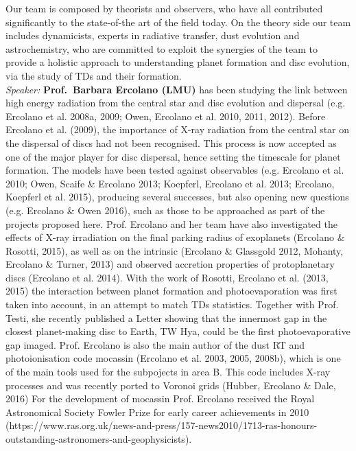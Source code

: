 \documentclass[10pt,fleqn,twoside]{article}
\begin{document}
Our team is composed by theorists and observers, who have all
contributed significantly to the state-of-the art of the field today. 
On the theory side our team includes
dynamicists, experts in radiative transfer, dust evolution and astrochemistry, who are
committed to exploit the synergies of the team to provide a holistic
approach to understanding planet formation and disc evolution, via the
study of TDs and their formation. \\

{\it Speaker: }{\bf Prof.\ Barbara Ercolano (LMU)} has been studying the link between high
energy radiation from the central star and disc evolution and
dispersal (e.g. Ercolano et al. 2008a, 2009; Owen, Ercolano et
al. 2010, 2011, 2012). Before Ercolano et al. (2009), the importance
of X-ray radiation from the central star on the dispersal of discs had
not been recognised. This process is now accepted as one of the major
player for disc dispersal, hence setting the timescale for planet
formation. The models have been tested against observables
(e.g. Ercolano et al. 2010; Owen, Scaife \& Ercolano 2013; Koepferl,
Ercolano et al. 2013; Ercolano, Koepferl et al. 2015), producing
several successes, but also opening new questions (e.g. Ercolano \&
Owen 2016), such as those to be
approached as part of the projects proposed here. Prof. Ercolano and
her team have also investigated the effects of X-ray irradiation on
the final parking radius of exoplanets (Ercolano \& Rosotti, 2015), as
well as on the intrinsic (Ercolano \& Glassgold 2012, Mohanty,
Ercolano \& Turner, 2013) and observed
accretion properties of protoplanetary discs (Ercolano et
al. 2014). With the work of Rosotti, Ercolano et al. (2013, 2015) the
interaction between planet formation and photoevaporation was first
taken into account, in an attempt to match TDs
statistics. Together with Prof. Testi, she recently published a Letter
showing that the innermost gap in the closest planet-making disc to
Earth, TW Hya, could be the first photoevaporative gap
imaged. Prof. Ercolano is also the main author of the dust RT and 
photoionisation code {\sc mocassin} (Ercolano et al. 2003, 2005,
2008b), which is one of the main tools
used for the subpojects in area B. This code includes X-ray processes
and was recently ported to Voronoi grids (Hubber, Ercolano \& Dale,
2016) For the development of {\sc
  mocassin} Prof. Ercolano received the Royal Astronomical Society
Fowler Prize for early career achievements in 2010 (https://www.ras.org.uk/news-and-press/157-news2010/1713-ras-honours-outstanding-astronomers-and-geophysicists). \\
\end{document}
